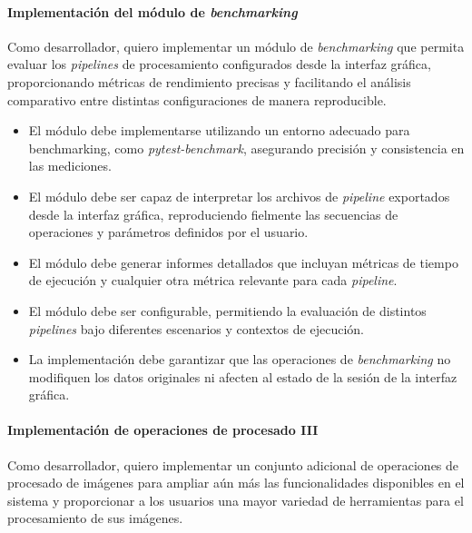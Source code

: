 \paragraph{Implementación del módulo de \textit{benchmarking}} \label{hist:implementacion_modulo_benchmarking}
Como desarrollador, quiero implementar un módulo de \textit{benchmarking} que permita evaluar los \textit{pipelines} 
de procesamiento configurados desde la interfaz gráfica, proporcionando métricas de rendimiento precisas y 
facilitando el análisis comparativo entre distintas configuraciones de manera reproducible.

\begin{itemize}[noitemsep]
	\item El módulo debe implementarse utilizando un entorno adecuado para benchmarking, como \textit{pytest-benchmark}, asegurando precisión y consistencia en las mediciones.
	\item El módulo debe ser capaz de interpretar los archivos de \textit{pipeline} exportados desde la interfaz gráfica, reproduciendo fielmente las secuencias de operaciones y parámetros definidos por el usuario.
	\item El módulo debe generar informes detallados que incluyan métricas de tiempo de ejecución y cualquier otra métrica relevante para cada \textit{pipeline}.
	\item El módulo debe ser configurable, permitiendo la evaluación de distintos \textit{pipelines} bajo diferentes escenarios y contextos de ejecución.
	\item La implementación debe garantizar que las operaciones de \textit{benchmarking} no modifiquen los datos originales ni afecten al estado de la sesión de la interfaz gráfica.
\end{itemize}

\paragraph{Implementación de operaciones de procesado III} \label{hist:implementacion_operaciones_procesado_iii}
Como desarrollador, quiero implementar un conjunto adicional de operaciones de procesado de imágenes para ampliar
aún más las funcionalidades disponibles en el sistema y proporcionar a los usuarios una mayor variedad de herramientas
para el procesamiento de sus imágenes.

